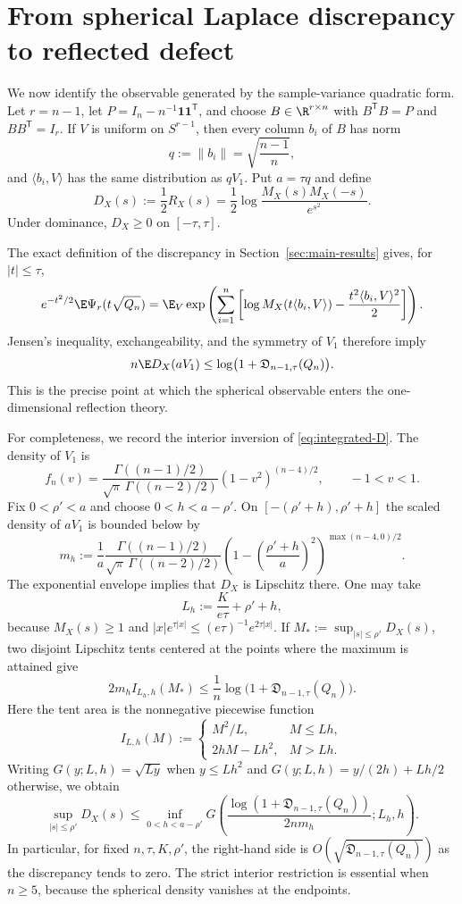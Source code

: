 \section{From spherical Laplace discrepancy to reflected defect}\label{sec:radial}

We now identify the observable generated by the sample-variance quadratic form. Let $r=n-1$, let $P=I_n-n^{-1}\mathbf1\mathbf1^{\mathsf T}$, and choose $B\in\R^{r\times n}$ with $B^{\mathsf T}B=P$ and $BB^{\mathsf T}=I_r$. If $V$ is uniform on $S^{r-1}$, then every column $b_i$ of $B$ has norm
\[
q:=\|b_i\|=\sqrt{\frac{n-1}{n}},
\]
and $\langle b_i,V\rangle$ has the same distribution as $qV_1$. Put $a=\tau q$ and define
\[
D_X(s):=\frac12R_X(s)
 =\frac12\log\frac{M_X(s)M_X(-s)}{e^{s^2}}.
\]
Under dominance, $D_X\ge0$ on $[-\tau,\tau]$.

The exact definition of the discrepancy in Section~\ref{sec:main-results} gives, for $|t|\le\tau$,
\[
e^{-t^2/2}\E\Psi_r(t\sqrt{Q_n})
 =\E_V\exp\left(\sum_{i=1}^n\left[\log M_X(t\langle b_i,V\rangle)-\frac{t^2\langle b_i,V\rangle^2}{2}\right]\right).
\]
Jensen's inequality, exchangeability, and the symmetry of $V_1$ therefore imply
\begin{equation}\label{eq:integrated-D}
n\E D_X(aV_1)\le\log\bigl(1+\mathfrak D_{n-1,\tau}(Q_n)\bigr).
\end{equation}
This is the precise point at which the spherical observable enters the one-dimensional reflection theory.

For completeness, we record the interior inversion of \eqref{eq:integrated-D}. The density of $V_1$ is
\[
f_{n}(v)=
\frac{\Gamma((n-1)/2)}{\sqrt\pi\,\Gamma((n-2)/2)}
(1-v^2)^{(n-4)/2},
\qquad -1<v<1.
\]
Fix $0<\rho'<a$ and choose $0<h<a-\rho'$. On $[-(\rho'+h),\rho'+h]$ the scaled density of $aV_1$ is bounded below by
\[
m_h:=\frac1a\frac{\Gamma((n-1)/2)}{\sqrt\pi\,\Gamma((n-2)/2)}
\left(1-\left(\frac{\rho'+h}{a}\right)^2\right)^{\max(n-4,0)/2}.
\]
The exponential envelope implies that $D_X$ is Lipschitz there. One may take
\[
L_h:=\frac{K}{e\tau}+\rho'+h,
\]
because $M_X(s)\ge1$ and $|x|e^{\tau|x|}\le(e\tau)^{-1}e^{2\tau|x|}$. If $M_*:=\sup_{|s|\le\rho'}D_X(s)$, two disjoint Lipschitz tents centered at the points where the maximum is attained give
\[
2m_h I_{L_h,h}(M_*)
 \le \frac1n\log\bigl(1+\mathfrak D_{n-1,\tau}(Q_n)\bigr).
 \]
Here the tent area is the nonnegative piecewise function
\[
I_{L,h}(M):=
\begin{cases}
M^2/L,& M\le Lh,\\
2hM-Lh^2,& M>Lh.
\end{cases}
\]
Writing $G(y;L,h)=\sqrt{Ly}$ when $y\le Lh^2$ and $G(y;L,h)=y/(2h)+Lh/2$ otherwise, we obtain
\begin{equation}\label{eq:pointwise-D}
\sup_{|s|\le\rho'}D_X(s)
\le\inf_{0<h<a-\rho'}G\left(\frac{\log(1+\mathfrak D_{n-1,\tau}(Q_n))}{2nm_h};L_h,h\right).
\end{equation}
In particular, for fixed $n,\tau,K,\rho'$, the right-hand side is $O(\sqrt{\mathfrak D_{n-1,\tau}(Q_n)})$ as the discrepancy tends to zero. The strict interior restriction is essential when $n\ge5$, because the spherical density vanishes at the endpoints.
